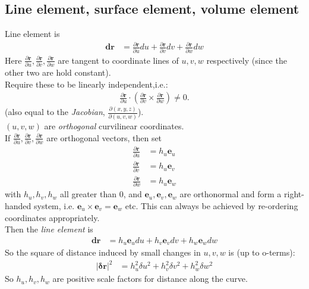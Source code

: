 \documentclass[a4paper]{article}
\begin{document}
\subsection{Line element, surface element, volume element}
Line element is
\begin{equation*}
\begin{aligned}
\mathbf{dr}&=\frac{\partial \mathbf{r}}{\partial u}du + \frac{\partial \mathbf{r}}{\partial v}dv + \frac{\partial \mathbf{r}}{\partial w}dw
\end{aligned}
\end{equation*}
Here $\frac{\partial \mathbf{r}}{\partial u},\frac{\partial \mathbf{r}}{\partial v},\frac{\partial \mathbf{r}}{\partial w}$ are tangent to coordinate lines of $u,v,w$ respectively (since the other two are hold constant).\\
Require these to be linearly independent,i.e.:
\begin{equation*}
\begin{aligned}
\frac{\partial \mathbf{r}}{\partial u}\cdot\left(\frac{\partial \mathbf{r}}{\partial v}\times\frac{\partial \mathbf{r}}{\partial w}\right) \neq 0.
\end{aligned}
\end{equation*}
(also equal to the \emph{Jacobian}, $\frac{\partial \left(x,y,z\right)}{\partial \left(u,v,w\right)}$).\\
$\left(u,v,w\right)$ are \emph{orthogonal} curvilinear coordinates.\\
If $\frac{\partial \mathbf{r}}{\partial u},\frac{\partial \mathbf{r}}{\partial v},\frac{\partial \mathbf{r}}{\partial w}$ are orthogonal vectors, then set
\begin{equation}\label{eq:7}
\begin{aligned}
\frac{\partial \mathbf{r}}{\partial u} &= h_u\mathbf{e}_u\\
\frac{\partial \mathbf{r}}{\partial v} &= h_u\mathbf{e}_v\\
\frac{\partial \mathbf{r}}{\partial w} &= h_u\mathbf{e}_w
\end{aligned}
\end{equation}
with $h_u,h_v,h_w$ all greater than 0, and $\mathbf{e}_u,\mathbf{e}_v,\mathbf{e}_w$ are orthonormal and form a right-handed system, i.e. $\mathbf{e}_u\times \mathbf{e}_v = \mathbf{e}_w$ etc. This can always be achieved by re-ordering coordinates appropriately.\\
Then the \emph{line element} is
\begin{equation}\label{eq:8}
\begin{aligned}
\mathbf{dr} &= h_u\mathbf{e}_u du + h_v\mathbf{e}_v dv + h_w\mathbf{e}_w dw
\end{aligned}
\end{equation}
So the square of distance induced by small changes in $u,v,w$ is (up to o-terms):
\begin{equation*}
\begin{aligned}
|\mathbf{\delta r}|^2 &= h_u^2\delta u^2+h_v^2\delta v^2+h_w^2\delta w^2
\end{aligned}
\end{equation*}
So $h_u,h_v,h_w$ are positive scale factors for distance along the curve.\\
\end{document}
